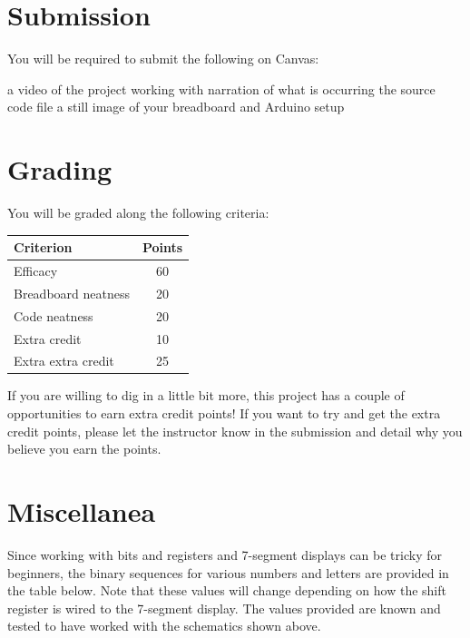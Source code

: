 \newpage
\begin{widepar}
    \section*{Submission}
    You will be required to submit the following on Canvas:
    \begin{outline}
        \1 a video of the project working with narration of what is occurring
        \1 the source code file
        \1 a still image of your breadboard and Arduino setup
    \end{outline}

    \section*{Grading}
    You will be graded along the following criteria:

    \begin{table}[h!]
        \begin{tabular}{ l | c }
            \toprule
            Criterion & Points \\

            \midrule
            Efficacy & 60 \\
            Breadboard neatness & 20 \\
            Code neatness & 20 \\
            Extra credit & 10 \\
            Extra extra credit \footnotemark & 25 \\

            \bottomrule
        \end{tabular}
    \end{table}

    If you are willing to dig in a little bit more, this project has a couple of opportunities to earn extra credit points!
    If you want to try and get the extra credit points, please let the instructor know in the submission and detail why you believe you earn the points.

    \section*{Miscellanea}
    Since working with bits and registers and 7-segment displays can be tricky for beginners, the binary sequences for various numbers and letters are provided in the table below. Note that these values will change depending on how the shift register is wired to the 7-segment display. The values provided are known and tested to have worked with the schematics shown above.


\end{widepar}
